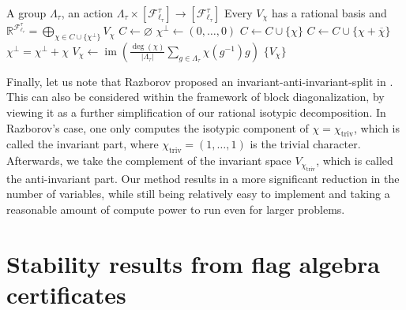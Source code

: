 \documentclass[a4paper,11pt]{article}
\numberwithin{equation}{section}
\newcommand{\mF}{\mathcal{F}}
\newcommand{\RR}{\mathbb{R}}
\begin{document}
\begin{algorithm}
    \caption{Rational Isotypic Decomposition}
    \label{alg:Rational_Isotypic}
    \begin{algorithmic}[2]
        \REQUIRE A group $\Lambda_\tau$, an action $\Lambda_\tau\times [\mF^\tau_{\ell_\tau}]\to [\mF^\tau_{\ell_\tau}]$
        \ENSURE Every $V_\chi$ has a rational basis and $\RR^{\mF^\tau_{\ell_\tau}} = \bigoplus_{\chi\in C\cup\{\chi^\bot\}} V_\chi$
        \STATE $ C \gets \varnothing$
        \STATE $ \chi^\bot \gets (0,\dots,0) $
                \STATE $C \gets C \cup \{\chi\}$
                \STATE $C \gets C \cup \{\chi+\overline{\chi}\}$
            \ELSE
                \STATE $\chi^\bot = \chi^\bot + \chi$
            \ENDIF
        \ENDFOR
            \STATE $V_\chi \gets \operatorname{im}(\frac{\operatorname{deg}(\chi)}{|\Lambda_\tau|}\sum_{g\in \Lambda_\tau} \chi(g^{-1}) g)$ 
        \ENDFOR
        \RETURN $\{V_\chi\}$
    \end{algorithmic}
\end{algorithm}

\medskip

Finally, let us note that Razborov proposed an invariant-anti-invariant-split in \cite{Razborov_2010}. This can also be considered within the framework of block diagonalization, by viewing it as a further simplification of our rational isotypic decomposition. In Razborov's case, one only computes the isotypic component of $\chi = \chi_{\operatorname{triv}}$, which is called the invariant part, where $\chi_{\operatorname{triv}} = (1,\dots, 1)$ is the trivial character. Afterwards, we take the complement of the invariant space $V_{\chi_{\operatorname{triv}}}$, which is called the anti-invariant part. Our method results in a more significant reduction in the number of variables, while still being relatively easy to implement and taking a reasonable amount of compute power to run even for larger problems.


\section{Stability results from flag algebra certificates}\label{sec:stability}
\end{document}
